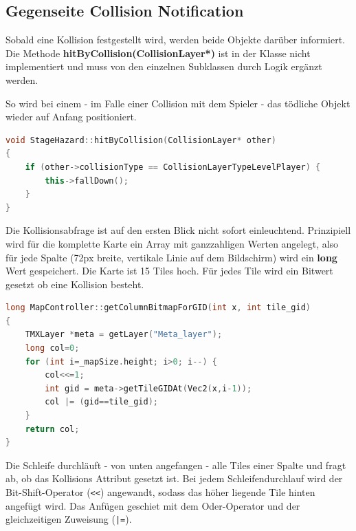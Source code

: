 \subsection{Gegenseite Collision Notification}

Sobald eine Kollision festgestellt wird, werden beide Objekte darüber informiert. Die Methode \textbf{hitByCollision(CollisionLayer*)} ist in der  Klasse nicht implementiert und muss von den einzelnen Subklassen durch Logik ergänzt werden.

So wird bei einem  - im Falle einer Collision mit dem Spieler - das tödliche Objekt wieder auf Anfang positioniert.

\begin{lstlisting}[label=lst:hit_by_collision,
				   language=C++,
				   firstnumber=32,
				   caption=Collision Notification ( StageHazard.cpp )]
void StageHazard::hitByCollision(CollisionLayer* other)
{
	if (other->collisionType == CollisionLayerTypeLevelPlayer) {
		this->fallDown();
	}
}
\end{lstlisting}



\label{sec:4_Kollisionsabfrage}

Die Kollisionsabfrage ist auf den ersten Blick nicht sofort einleuchtend. Prinzipiell wird für die komplette Karte ein Array mit ganzzahligen Werten angelegt, also für jede Spalte (72px breite, vertikale Linie auf dem Bildschirm) wird ein \textbf{long} Wert gespeichert.
Die Karte ist 15 Tiles hoch. Für jedes Tile wird ein Bitwert gesetzt ob eine Kollision besteht.

\begin{lstlisting}[label=lst:collision_detection,
				   language=C++,
				   firstnumber=271,
				   caption=Collision Column abfragen ( MapController.cpp )]
long MapController::getColumnBitmapForGID(int x, int tile_gid)
{
	TMXLayer *meta = getLayer("Meta_layer");
	long col=0;
	for (int i=_mapSize.height; i>0; i--) {
		col<<=1;
		int gid = meta->getTileGIDAt(Vec2(x,i-1));
		col |= (gid==tile_gid);
	}
	return col;
}
\end{lstlisting}

Die Schleife durchläuft - von unten angefangen - alle Tiles einer Spalte und fragt ab, ob das Kollisions Attribut gesetzt ist. Bei jedem Schleifendurchlauf wird der Bit-Shift-Operator (\texttt{<<}) angewandt, sodass das höher liegende Tile hinten angefügt wird. Das Anfügen geschiet mit dem Oder-Operator und der gleichzeitigen Zuweisung (\texttt{|=}).

